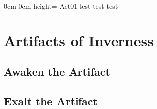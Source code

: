 	{}%
	{0cm}%
	{0cm}%
	{height=\paperheight}%
	{Act01}%
	{test}%
	{test}%
	{test}%




\chapter*{Artifacts of Inverness} %
\section*{Awaken the Artifact}
\section*{Exalt the Artifact}



